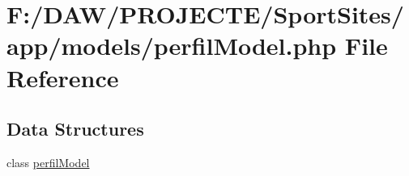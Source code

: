 \hypertarget{perfil_model_8php}{}\section{F\+:/\+D\+A\+W/\+P\+R\+O\+J\+E\+C\+T\+E/\+Sport\+Sites/app/models/perfil\+Model.php File Reference}
\label{perfil_model_8php}
\subsection*{Data Structures}
\begin{DoxyCompactItemize}
\item 
class \hyperlink{classperfil_model}{perfil\+Model}
\end{DoxyCompactItemize}
